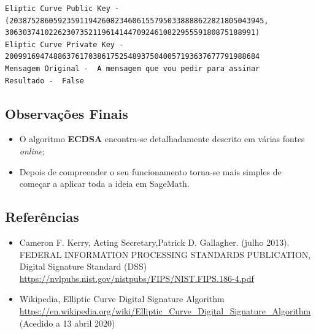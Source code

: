\documentclass[12pt]{report}
\providecommand{\tightlist}{%
      \setlength{\itemsep}{0pt}\setlength{\parskip}{0pt}}
\begin{document}
    \begin{Verbatim}[commandchars=\\\{\}]
Eliptic Curve Public Key -  (2038752860592359119426082346061557950338888622821805043945, 306303741022623073521196141447092461082295559180875188991)
Eliptic Curve Private Key -  2009916947488637617038617525489375040057193637677791988684
Mensagem Original -  A mensagem que vou pedir para assinar
Resultado -  False

    \end{Verbatim}
\vspace{5 mm}
    \subsection{Observações Finais}\label{observauxe7uxf5es-finais}

\begin{itemize}
\tightlist
\item
  O algoritmo \textbf{ECDSA} encontra-se detalhadamente descrito em
  várias fontes \emph{online};
\vspace{2 mm}
\item
  Depois de compreender o seu funcionamento torna-se mais simples de
  começar a aplicar toda a ideia em SageMath.
\end{itemize}
\vspace{5 mm}
    \subsection{Referências}\label{referuxeancias}

\begin{itemize}
\tightlist
\item
  Cameron F. Kerry, Acting Secretary,Patrick D. Gallagher. (julho 2013).
  FEDERAL INFORMATION PROCESSING STANDARDS PUBLICATION, Digital
  Signature Standard (DSS)
  \url{https://nvlpubs.nist.gov/nistpubs/FIPS/NIST.FIPS.186-4.pdf}
\item
  Wikipedia, Elliptic Curve Digital Signature Algorithm
  \url{https://en.wikipedia.org/wiki/Elliptic\_Curve\_Digital\_Signature\_Algorithm}
  (Acedido a 13 abril 2020)
\end{itemize}


    
\end{document}
